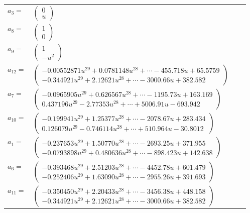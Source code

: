 \documentclass[1p]{elsarticle_modified}
\theoremstyle{definition}
\begin{document}
\begin{tabular}{m{7pt} m{180pt} m{7pt} m{180pt} }
\flushright $a_{3}=$&$\begin{pmatrix}0\\u\end{pmatrix}$ \\
\flushright $a_{8}=$&$\begin{pmatrix}1\\0\end{pmatrix}$ \\
\flushright $a_{9}=$&$\begin{pmatrix}1\\- u^2\end{pmatrix}$ \\
\flushright $a_{12}=$&$\begin{pmatrix}-0.00552871 u^{29}+0.0781148 u^{28}+\cdots-455.718 u+65.5759\\-0.344921 u^{29}+2.12621 u^{28}+\cdots-3000.66 u+382.582\end{pmatrix}$ \\
\flushright $a_{7}=$&$\begin{pmatrix}-0.0965905 u^{29}+0.626567 u^{28}+\cdots-1195.73 u+163.169\\0.437196 u^{29}-2.77353 u^{28}+\cdots+5006.91 u-693.942\end{pmatrix}$ \\
\flushright $a_{10}=$&$\begin{pmatrix}-0.199941 u^{29}+1.25377 u^{28}+\cdots-2078.67 u+283.434\\0.126079 u^{29}-0.746114 u^{28}+\cdots+510.964 u-30.8012\end{pmatrix}$ \\
\flushright $a_{1}=$&$\begin{pmatrix}-0.237653 u^{29}+1.50770 u^{28}+\cdots-2693.25 u+371.955\\-0.0793898 u^{29}+0.480636 u^{28}+\cdots-898.423 u+142.638\end{pmatrix}$ \\
\flushright $a_{6}=$&$\begin{pmatrix}-0.393468 u^{29}+2.51203 u^{28}+\cdots-4452.78 u+601.479\\-0.252406 u^{29}+1.63090 u^{28}+\cdots-2955.26 u+391.693\end{pmatrix}$ \\
\flushright $a_{11}=$&$\begin{pmatrix}-0.350450 u^{29}+2.20433 u^{28}+\cdots-3456.38 u+448.158\\-0.344921 u^{29}+2.12621 u^{28}+\cdots-3000.66 u+382.582\end{pmatrix}$ \\

\end{tabular}
\end{document}
